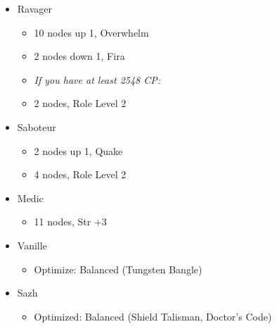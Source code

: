 \begin{multicols}{2}
\begin{menu}
\begin{itemize}
\begin{itemize}
              \begin{itemize}
                \item Ravager
                      \begin{itemize}
                        \item 10 nodes up 1, Overwhelm
                        \item 2 nodes down 1, Fira
                        \item \textit{If you have at least 2548 CP:}
                        \item 2 nodes, Role Level 2
                      \end{itemize}
                \item Saboteur
                      \begin{itemize}
                        \item 2 nodes up 1, Quake
                        \item 4 nodes, Role Level 2
                      \end{itemize}
                \item Medic
                      \begin{itemize}
                        \item 11 nodes, Str +3
                      \end{itemize}
              \end{itemize}
      \end{itemize}
      \columnbreak
      \equip
      \begin{itemize}
        \item Vanille
              \begin{itemize}
                \item \begin{flushleft}Optimize: Balanced (Tungsten Bangle)\end{flushleft}
              \end{itemize}
        \item Sazh
              \begin{itemize}
                \item \begin{flushleft}Optimized: Balanced (Shield Talisman, Doctor's Code)\end{flushleft}
              \end{itemize}
      \end{itemize}
    \end{itemize}
  \end{menu}
  \renewcommand{\first}{[1] Slash \& Burn (\com/\rav)}
  \renewcommand{\second}{[2] War \& Peace (\com/\med)}
  \renewcommand{\third}{[3] Tide Turner (\syn/\sab)}
  \renewcommand{\fourth}{[4] }
  \renewcommand{\fifth}{[5] Undermine (\rav/\sab)}
  \renewcommand{\sixth}{[6] Divide \& Conquer (\com/\sab)}


\end{multicols}
